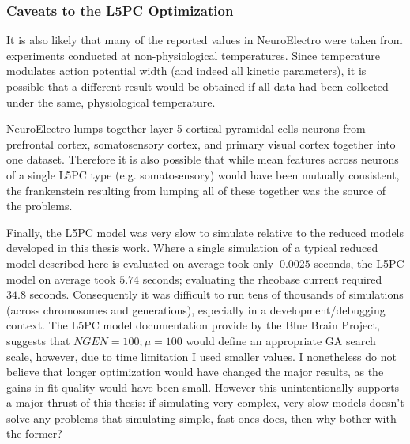 \subsubsection{Caveats to the L5PC Optimization}
It is also likely that many of the reported values in NeuroElectro were taken from experiments conducted at non-physiological temperatures.
Since temperature modulates action potential width \cite{goldin2017temperature} (and indeed all kinetic parameters), it is possible that a different result would be obtained if all data had been collected under the same, physiological temperature.

NeuroElectro lumps together layer 5 cortical pyramidal cells neurons from prefrontal cortex, somatosensory cortex, and primary visual cortex together into one dataset. 
Therefore it is also possible that while mean features across neurons of a single L5PC type (e.g. somatosensory) would have been mutually consistent, the frankenstein resulting from lumping all of these together was the source of the problems.

Finally, the L5PC model was very slow to simulate relative to the reduced models developed in this thesis work.
Where a single simulation of a typical reduced model described here is evaluated on average took only $~0.0025$ seconds, the L5PC model on average took $5.74$ seconds; evaluating the rheobase current required $34.8$ seconds.
Consequently it was difficult to run tens of thousands of simulations (across chromosomes and generations), especially in a development/debugging context.
The L5PC model documentation provide by the Blue Brain Project, suggests that $NGEN=100; \mu=100$ would define an appropriate GA search scale, however, due to time limitation I used smaller values. 
I nonetheless do not believe that longer optimization would have changed the major results, as the gains in fit quality would have been small.
However this unintentionally supports a major thrust of this thesis: if simulating very complex, very slow models doesn't solve any problems that simulating simple, fast ones does, then why bother with the former?


%



